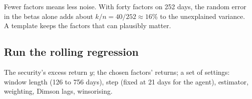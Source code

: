 \documentclass[11pt,a4paper]{article}
\begin{document}
\begin{tip}
Fewer factors means less noise. With forty factors on 252 days, the random error in
the betas alone adds about $k/n = 40/252 \approx 16\%$ to the unexplained variance.
A template keeps the factors that can plausibly matter.
\end{tip}

\subsection{Run the rolling regression}

\begin{ingredients}
The security's excess return $y$; the chosen factors' returns; a set of settings:
window length (126 to 756 days), step (fixed at 21 days for the agent),
estimator, weighting, Dimson lags, winsorising.
\end{ingredients}
\end{document}
